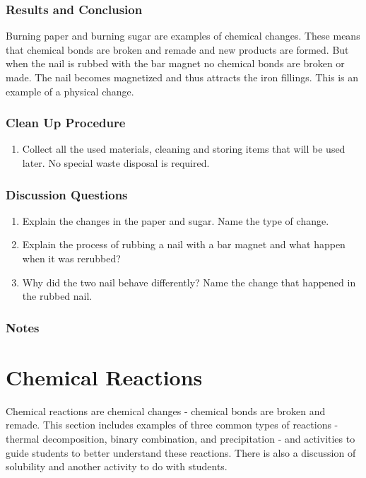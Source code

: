\subsubsection*{Results and Conclusion}
Burning paper and burning sugar are examples of chemical changes. These means that chemical bonds are broken and remade and new products are formed. But when the nail is rubbed with the bar magnet no chemical bonds are broken or made. The nail becomes magnetized and thus attracts the iron fillings. This is an example of a physical change.

\subsubsection*{Clean Up Procedure}
\begin{enumerate}
\item{Collect all the used materials, cleaning and storing items that will be used later. No special waste disposal is required.}
\end{enumerate}

\subsubsection*{Discussion Questions}
\begin{enumerate}
\item{Explain the changes in the paper and sugar. Name the type of change.}
\item{Explain the process of rubbing a nail with a bar magnet and what happen when it was rerubbed?}
\item{Why did the two nail behave differently? Name the change that happened in the rubbed nail.}
\end{enumerate}

\subsubsection*{Notes}

\section{ Chemical Reactions}
Chemical reactions are chemical changes - chemical bonds are broken and remade. This section includes examples of three common types of reactions - thermal decomposition, binary combination, and precipitation - and activities to guide students to better understand these reactions. There is also a discussion of solubility and another activity to do with students.

